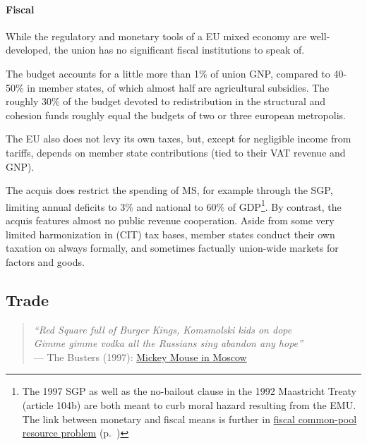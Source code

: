 \paragraph{Fiscal} While the regulatory and monetary tools of a \gls{EU} mixed economy are well-developed, the union has no significant fiscal institutions to speak of.


The budget accounts for a little more than 1\% of union \gls{GNP}, compared to 40-50\% in member states, of which almost half are agricultural subsidies. The roughly 30\% of the budget devoted to redistribution in the structural and cohesion funds roughly equal the budgets of two or three european metropolis. %

The \gls{EU} also does not levy its own taxes, but, except for negligible income from tariffs, depends on member state contributions (tied to their \gls{VAT} revenue and \gls{GNP}).

The acquis does restrict the spending of \gls{MS}, for example through the \gls{SGP}, limiting annual deficits to 3\% and national to 60\% of \gls{GDP}\footnote{
	The 1997 \gls{SGP} as well as the no-bailout clause in the 1992 Maastricht Treaty (article 104b) are both meant to curb moral hazard resulting from the \gls{EMU}. The link between monetary and fiscal means is further in \hyperref[sec:fiscal-CPR]{fiscal common-pool resource problem} (p.~\pageref{sec:fiscal-CPR})}.%
By contrast, the acquis features almost no public revenue cooperation. Aside from some very limited harmonization in (\gls{CIT}) tax bases, member states conduct their own taxation on always formally, and sometimes factually union-wide markets for factors and goods.

\subsection[Trade]{Trade}

\begin{verse}
	\emph{``Red Square full of Burger Kings, Komsmolski kids on dope \\
	Gimme gimme vodka all the Russians sing abandon any hope''\\}
	--- The Busters (1997): \href{http://www.youtube.com/watch?v=xsxRMOnpMTY}{Mickey Mouse in Moscow}\\
\end{verse}

